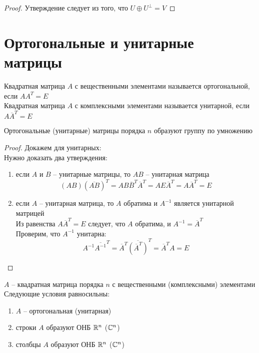 \begin{proof}
	Утверждение следует из того, что $ U \oplus U^\perp = V $
\end{proof}

\section{Ортогональные и унитарные матрицы}

\begin{definition}
	Квадратная матрица $ A $ с вещественными элементами называется ортогональной, если $ AA^T = E $ \\
	Квадратная матрица $ A $ с комплексными элементами называется унитарной, если $ A\overline{A}^T = E $
\end{definition}

\begin{props}
	\item Ортогональные (унитарные) матрицы порядка $ n $ образуют группу по умножению
	\begin{proof}
		Докажем для унитарных: \\
		Нужно доказать два утверждения:
		\begin{enumerate}
			\item если $ A $ и $ B $ -- унитарные матрицы, то $ AB $ -- унитарная матрица
			$$ (AB)(\overline{AB})^T = AB\overline{B}^T\overline{A}^T = AE\overline{A}^T = A\overline{A}^T = E $$
			\item если $ A $ -- унитарная матрица, то $ A $ обратима и $ A^{-1} $ является унитарной матрицей \\
			Из равенства $ A\overline{A}^T = E $ следует, что $ A $ обратима, и $ A^{-1} = \overline{A}^T $ \\
			Проверим, что $ A^{-1} $ унитарна:
			$$ A^{-1}\overline{A^{-1}}^T = \overline{A}^T \overline{(\overline{A}^T)}^T = \overline{A}^TA = E $$
		\end{enumerate}
	\end{proof}
	\item $ A $ -- квадратная матрица порядка $ n $ с вещественными (комплексными) элементами \\
	Следующие условия равносильны:
	\begin{enumerate}
		\item\label{en:441} $ A $ -- ортогональная (унитарная)
		\item\label{en:442} строки $ A $ образуют ОНБ $ \mathbb{R}^n $ ($ \mathbb{C}^n $)
		\item\label{en:443} столбцы $ A $ образуют ОНБ $ \mathbb{R}^n $ ($ \mathbb{C}^n $)

\end{enumerate}
\end{props}
